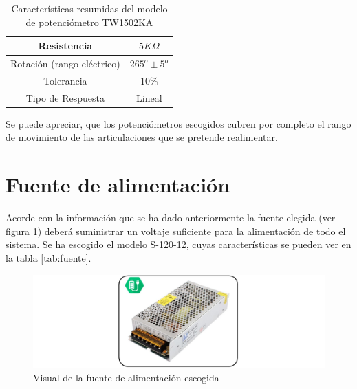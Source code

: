     \begin{table}[H]
        \caption{Características resumidas del modelo de potenciómetro TW1502KA}
        \label{tab:potenciometro}
            \begin{center}
                \begin{tabular}{ |c|c| }
                    \hline
                    Resistencia & $5K\Omega$  \\
                    \hline
                    Rotación (rango eléctrico) & $265^o \pm 5^o$\\
                    \hline
                    Tolerancia & 10\%  \\
                    \hline
                    Tipo de Respuesta & Lineal  \\
                    \hline
                \end{tabular}
            \end{center}
    \end{table}

    Se puede apreciar, que los potenciómetros escogidos cubren por completo el rango de movimiento de las articulaciones que se pretende realimentar.

\section{Fuente de alimentación} \label{sec:Electronica:fuente_alimentacion}
    Acorde con la información que se ha dado anteriormente la fuente elegida (ver figura \ref{fig:Electronica:fuente}) deberá suministrar un voltaje suficiente para la alimentación de todo el sistema. Se ha escogido el modelo S-120-12, cuyas características se pueden ver en la tabla \ref{tab:fuente}.
 
	\begin{figure}[H]
	  	\centering
	  	\includegraphics[width=\textwidth]{figuras/Imagenes_Electronica/fuente_alimentacion.jpg}
	  	\caption{Visual de la fuente de alimentación escogida}
	  	\label{fig:Electronica:fuente}
	\end{figure}
	

